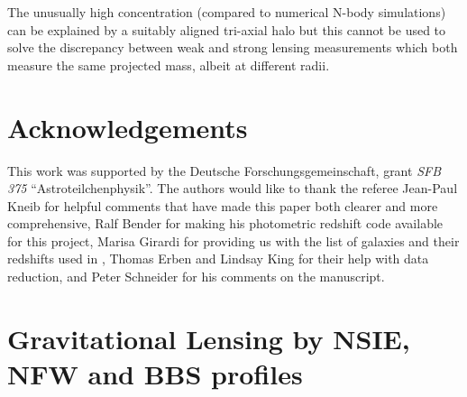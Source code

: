 \documentclass[useAMS,usenatbib]{mn2e}
\begin{document}
The unusually high concentration (compared to numerical N-body
simulations) can be explained by a suitably aligned tri-axial halo
\citep{oguri:05} but this cannot be used to solve the discrepancy
between weak and strong lensing measurements which both measure the
same projected mass, albeit at different radii.\\





\section*{Acknowledgements}
This work was supported by the Deutsche Forschungsgemeinschaft, grant
\emph{SFB 375} ``Astroteilchenphysik''. The authors would like to
thank the referee Jean-Paul Kneib for helpful comments that have made
this paper both clearer and more comprehensive, Ralf Bender for making
his photometric redshift code available for this project, Marisa
Girardi for providing us with the list of galaxies and their redshifts
used in \citet{girardi:97}, Thomas Erben and Lindsay King for their
help with data reduction, and Peter Schneider for his comments on the
manuscript.





\clearpage
\newpage

\appendix

\section{Gravitational Lensing by NSIE, NFW and BBS profiles}
\label{app:lensing}

\end{document}
